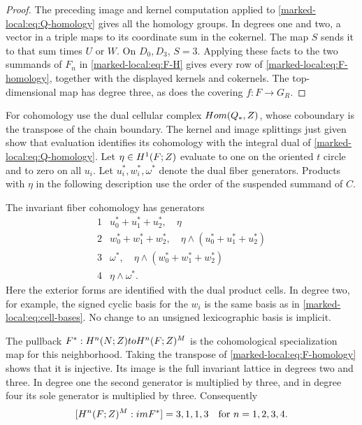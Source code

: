 \begin{proof}
The preceding image and kernel computation applied to
\eqref{marked-local:eq:Q-homology} gives all the homology groups.
In degrees one and two, a vector in a triple maps to its coordinate
sum in the cokernel. The map $S$ sends it to that sum times $U$ or $W$.
On $D_0,D_3$, $S=3$. Applying these facts to the two summands
of $F_n$ in \eqref{marked-local:eq:F-H} gives every row of
\eqref{marked-local:eq:F-homology}, together with the displayed kernels and
cokernels. The top-dimensional map has degree three, as does the
covering $f:F\to G_R$.
\end{proof}

For cohomology use the dual cellular complex
$Hom(Q_*,Z)$, whose coboundary is the transpose of
the chain boundary. The kernel and image splittings just given show
that evaluation identifies its cohomology with the integral dual of
\eqref{marked-local:eq:Q-homology}. Let $\eta\in H^1(F;Z)$ evaluate to one
on the oriented $t$ circle and to zero on all $u_i$.
Let $u_i^*,w_i^*,\omega^*$ denote
the dual fiber generators. Products with $\eta$ in the following
description use the order of the suspended summand of $C$.

The invariant fiber cohomology has generators
\[
\begin{array}{c|c}
 1&u_0^*+u_1^*+u_2^*,\quad\eta\\
 2&w_0^*+w_1^*+w_2^*,\quad
       \eta\wedge(u_0^*+u_1^*+u_2^*)\\
 3&\omega^*,\quad\eta\wedge(w_0^*+w_1^*+w_2^*)\\
 4&\eta\wedge\omega^*.
\end{array}
\]
Here the exterior forms are identified with the dual product cells.
In degree two, for example, the signed cyclic basis for the $w_i$
is the same basis as in \eqref{marked-local:eq:cell-bases}. No change to an
unsigned lexicographic basis is implicit.

The pullback $F^*:H^n(N;Z)to H^n(F;Z)^M$ is the
cohomological specialization map for this neighborhood.
Taking the transpose of \eqref{marked-local:eq:F-homology} shows that it is
injective. Its image is the
full invariant lattice in degrees two and three. In degree one the
second generator is multiplied by three, and in degree four its sole
generator is multiplied by three. Consequently
\begin{equation}\label{marked-local:eq:specialization-indices}
 [H^n(F;Z)^M:im F^*]=3,1,1,3
                         \quad\text{for }n=1,2,3,4.
\end{equation}

